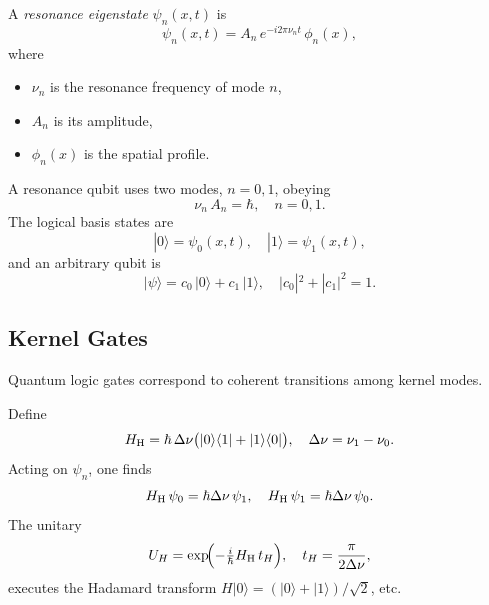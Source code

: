 A \emph{resonance eigenstate} $\psi_n(x,t)$ is
\[
\psi_n(x,t) = A_n\,e^{-i2\pi\nu_n t}\,\phi_n(x),
\]
where
\begin{itemize}
  \item $\nu_n$ is the resonance frequency of mode $n$,
  \item $A_n$ is its amplitude,
  \item $\phi_n(x)$ is the spatial profile.
\end{itemize}

\begin{definition}\label{def:qubit}
A resonance qubit uses two modes, $n=0,1$, obeying
\begin{equation}\label{eq:qubit_quant}
\nu_n\,A_n = \hbar,
\quad n=0,1.
\end{equation}
The logical basis states are
\begin{equation}\label{eq:qubit_basis}
|0\rangle = \psi_0(x,t),
\quad
|1\rangle = \psi_1(x,t),
\end{equation}
and an arbitrary qubit is
\begin{equation}\label{eq:qubit_superposition}
|\psi\rangle
= c_0\,|0\rangle + c_1\,|1\rangle,
\quad |c_0|^2 + |c_1|^2 = 1.
\end{equation}
\end{definition}

\subsection{Kernel Gates}

Quantum logic gates correspond to coherent transitions among kernel modes.

\begin{definition}\label{def:had_ham}
Define
\begin{equation}\label{eq:H_hadamard}
H_{\rm H}
= \hbar\,\Delta\nu\bigl(|0\rangle\langle1| + |1\rangle\langle0|\bigr),
\quad
\Delta\nu = \nu_1 - \nu_0.
\end{equation}
Acting on $\psi_n$, one finds
\[
H_{\rm H}\,\psi_0 = \hbar\Delta\nu\,\psi_1,
\quad
H_{\rm H}\,\psi_1 = \hbar\Delta\nu\,\psi_0.
\]
The unitary
\begin{equation}\label{eq:U_hadamard}
U_H = \exp\!\Bigl(-\tfrac{i}{\hbar}H_{\rm H}\,t_H\Bigr),
\quad
t_H = \frac{\pi}{2\Delta\nu},
\end{equation}
executes the Hadamard transform $H|0\rangle = (|0\rangle+|1\rangle)/\sqrt2$, etc.
\end{definition}

